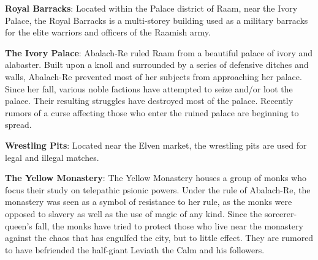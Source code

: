{	\textbf{Royal Barracks}: Located within the Palace district of Raam, near the Ivory Palace, the Royal Barracks is a multi-storey building used as a military barracks for the elite warriors and officers of the Raamish army.

	\textbf{The Ivory Palace}: Abalach-Re ruled Raam from a beautiful palace of ivory and alabaster. Built upon a knoll and surrounded by a series of defensive ditches and walls, Abalach-Re prevented most of her subjects from approaching her palace. Since her fall, various noble factions have attempted to seize and/or loot the palace. Their resulting struggles have destroyed most of the palace. Recently rumors of a curse affecting those who enter the ruined palace are beginning to spread.

	\textbf{Wrestling Pits}: Located near the Elven market, the wrestling pits are used for legal and illegal matches.

	\textbf{The Yellow Monastery}: The Yellow Monastery houses a group of monks who focus their study on telepathic psionic powers. Under the rule of Abalach-Re, the monastery was seen as a symbol of resistance to her rule, as the monks were opposed to slavery as well as the use of magic of any kind. Since the sorcerer-queen's fall, the monks have tried to protect those who live near the monastery against the chaos that has engulfed the city, but to little effect. They are rumored to have befriended the half-giant Leviath the Calm and his followers.
}
